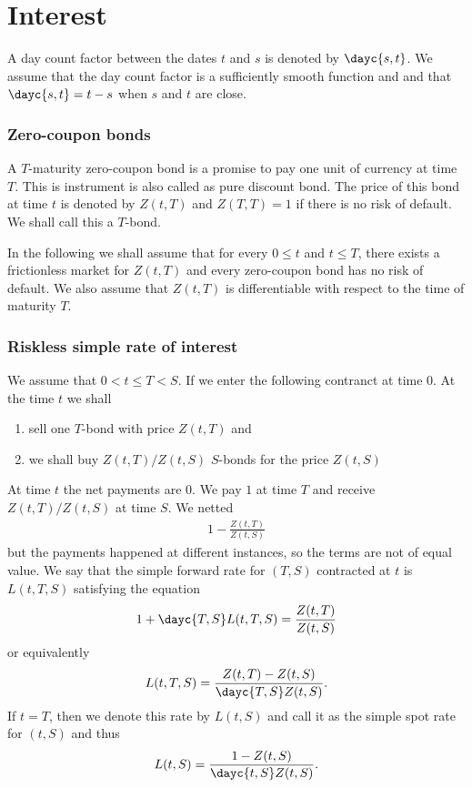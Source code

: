 \chapter{Interest}

A day count factor between the dates $t$ and $s$ is denoted by $\dayc{s,t}$. We assume that the day count factor is a sufficiently smooth function and and that $\dayc{s,t} = t-s$ when $s$ and $t$ are close.

\subsection{Zero-coupon bonds}

A $T$-maturity zero-coupon bond is a promise to pay one unit of currency at time $T$. This is instrument is also called as pure discount bond. The price of this bond at time $t$ is denoted by $Z(t,T)$ and $Z(T,T) = 1$ if there is no risk of default. We shall call this a $T$-bond.

In the following we shall assume that for every $0 \leq t$ and $t \leq T$, there exists a frictionless market for $Z(t,T)$ and every zero-coupon bond has no risk of default. We also assume that $Z(t,T)$ is differentiable with respect to the time of maturity $T$.

\subsection{Riskless simple rate of interest}

We assume that $0 < t \leq T < S$. If we enter the following contranct at time $0$. At the time $t$ we shall
  \begin{enumerate}
    \item sell one $T$-bond with price $Z(t,T)$ and
    \item we shall buy $Z(t,T) / Z(t,S)$ $S$-bonds for the price $Z(t,S)$
  \end{enumerate}
At time $t$ the net payments are $0$. We pay $1$ at time $T$ and receive $Z(t,T) / Z(t,S)$ at time $S$. We netted
  \begin{align}
   1 - \frac{Z(t,T)}{Z(t,S)}
  \end{align}
but the payments happened at different instances, so the terms are not of equal value. We say that the simple forward rate for $(T,S)$ contracted at $t$ is $L(t,T,S)$ satisfying the equation
  \begin{align}
   1 + \dayc{T,S} L(t,T,S) = \frac{Z(t,T)}{Z(t,S)}
  \end{align}
or equivalently
  \begin{align}
  \label{simplyinterestrate}
   L(t,T,S) = \frac{Z(t,T) - Z(t,S)}{ \dayc{T,S}  Z(t,S)} .
  \end{align}  
If $t=T$, then we denote this rate by $L(t,S)$ and call it as the simple spot rate for $(t,S)$ and thus
  \begin{align}
    L(t,S) = \frac{ 1 - Z(t,S) }{ \dayc{t,S} Z(t,S) } .
  \end{align}
  

